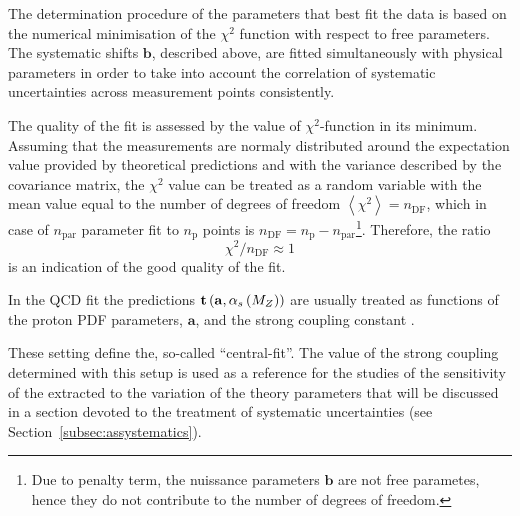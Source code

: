 The determination procedure of the parameters that best fit the data is based on the numerical minimisation of the $\chi^2$ function with respect to free parameters. The systematic shifts $\mathbf{b}$, described above, are fitted simultaneously with physical parameters in order to take into account the correlation of systematic uncertainties across measurement points consistently.

The quality of the fit is assessed by the value of $\chi^2$-function in its minimum. Assuming that the measurements are normaly distributed around the expectation value provided by theoretical predictions and with the variance described by the covariance matrix, the $\chi^2$ value can be treated as a random variable with the mean value equal to the number of degrees of freedom $\left\langle \chi^2 \right\rangle = n_\text{DF}$, which in case of $n_\text{par}$ parameter fit to $n_\text{p}$ points is $n_\text{DF}=n_\text{p}-n_\text{par}$\footnote{Due to penalty term, the nuissance parameters $\mathbf{b}$ are not free parametes, hence they do not contribute to the number of degrees of freedom.}. Therefore, the ratio
\begin{equation}
 \chi^2/n_\text{DF} \approx 1
\end{equation}
is an indication of the good quality of the fit.

In the QCD fit the predictions $\mathbf{t}\left( \mathbf{a},\mbox{$\alpha_{s}\left(M_{Z}\right)$}\right)$ are usually treated as functions of the proton PDF parameters, $\mathbf{a}$,  and the strong coupling constant \asz. 



These setting define the, so-called ``central-fit''. The value of the strong coupling determined with this setup is used as a reference for the studies of the sensitivity of the extracted \asz to the variation of the theory parameters that will be discussed in a section devoted to the treatment of systematic uncertainties (see Section~\ref{subsec:assystematics}).
